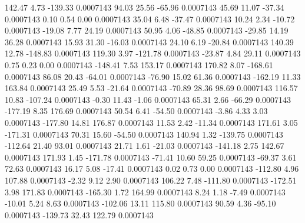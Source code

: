       142.47        4.73     -139.33     0.0007143
       94.03       25.56      -65.96     0.0007143
       45.69       11.07      -37.34     0.0007143
        0.10        0.54        0.00     0.0007143
       35.04        6.48      -37.47     0.0007143
       10.24        2.34      -10.72     0.0007143
      -19.08        7.77       24.19     0.0007143
       50.95        4.06      -48.85     0.0007143
      -29.85       14.19       36.28     0.0007143
       15.93       31.30      -16.03     0.0007143
       24.10        6.19      -20.84     0.0007143
      140.39       12.78     -148.83     0.0007143
      119.30        3.97     -121.78     0.0007143
      -23.87        4.84       29.11     0.0007143
        0.75        0.23        0.00     0.0007143
     -148.41        7.53      153.17     0.0007143
      170.82        8.07     -168.61     0.0007143
       86.08       20.43      -64.01     0.0007143
      -76.90       15.02       61.36     0.0007143
     -162.19       11.33      163.84     0.0007143
       25.49        5.53      -21.64     0.0007143
      -70.89       28.36       98.69     0.0007143
      116.57       10.83     -107.24     0.0007143
       -0.30       11.43       -1.06     0.0007143
       65.31        2.66      -66.29     0.0007143
     -177.19        8.35      176.69     0.0007143
       50.54        6.41      -54.50     0.0007143
       -3.86        4.33        3.03     0.0007143
     -177.80       14.81      176.87     0.0007143
       11.53        2.42      -11.34     0.0007143
      171.61        3.05     -171.31     0.0007143
       70.31       15.60      -54.50     0.0007143
      140.94        1.32     -139.75     0.0007143
     -112.64       21.40       93.01     0.0007143
       21.71        1.61      -21.03     0.0007143
     -141.18        2.75      142.67     0.0007143
      171.93        1.45     -171.78     0.0007143
      -71.41       10.60       59.25     0.0007143
      -69.37        3.61       72.63     0.0007143
       16.17        5.08      -17.41     0.0007143
        0.02        0.73        0.00     0.0007143
     -112.80        4.96      107.88     0.0007143
       -2.32        9.12        2.90     0.0007143
      106.22        7.48     -111.80     0.0007143
     -172.51        3.98      171.83     0.0007143
     -165.30        1.72      164.99     0.0007143
        8.24        1.18       -7.49     0.0007143
      -10.01        5.24        8.63     0.0007143
     -102.06       13.11      115.80     0.0007143
       90.59        4.36      -95.10     0.0007143
     -139.73       32.43      122.79     0.0007143

